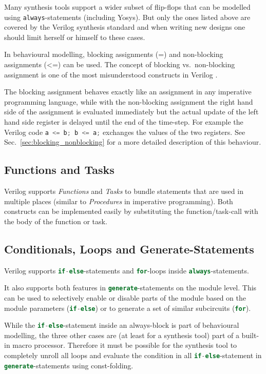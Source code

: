 Many synthesis tools support a wider subset of flip-flops that can be modelled
using {\tt always}-statements (including Yosys). But only the ones listed above
are covered by the Verilog synthesis standard and when writing new designs one
should limit herself or himself to these cases.

In behavioural modelling, blocking assignments (=) and non-blocking assignments
(<=) can be used. The concept of blocking vs.~non-blocking assignment is one
of the most misunderstood constructs in Verilog \cite{Cummings00}.

The blocking assignment behaves exactly like an assignment in any imperative
programming language, while with the non-blocking assignment the right hand side
of the assignment is evaluated immediately but the actual update of the left
hand side register is delayed until the end of the time-step. For example the Verilog
code \lstinline[language=Verilog]{a <= b; b <= a;} exchanges the values of
the two registers. See Sec.~\ref{sec:blocking_nonblocking} for a more
detailed description of this behaviour.

\subsection{Functions and Tasks}

Verilog supports {\it Functions} and {\it Tasks} to bundle statements that are
used in multiple places (similar to {\it Procedures} in imperative programming).
Both constructs can be implemented easily by substituting the function/task-call
with the body of the function or task.

\subsection{Conditionals, Loops and Generate-Statements}

Verilog supports \lstinline[language=Verilog]{if-else}-statements and
\lstinline[language=Verilog]{for}-loops inside \lstinline[language=Verilog]{always}-statements.

It also supports both features in \lstinline[language=Verilog]{generate}-statements
on the module level. This can be used to selectively enable or disable parts of the
module based on the module parameters (\lstinline[language=Verilog]{if-else})
or to generate a set of similar subcircuits (\lstinline[language=Verilog]{for}).

While the \lstinline[language=Verilog]{if-else}-statement
inside an always-block is part of behavioural modelling, the three other cases
are (at least for a synthesis tool) part of a built-in macro processor. Therefore it must
be possible for the synthesis tool to completely unroll all loops and evaluate the
condition in all \lstinline[language=Verilog]{if-else}-statement in
\lstinline[language=Verilog]{generate}-statements using const-folding.

